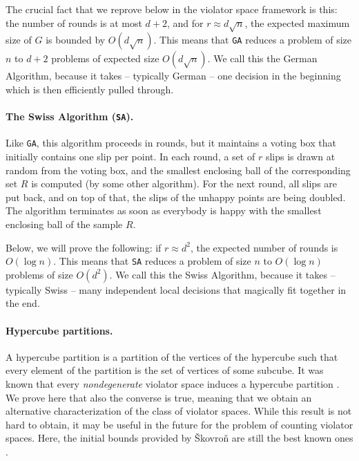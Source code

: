 \documentclass[12pt]{article}
\theoremstyle{remark}
\def\stageI{\texttt{GA}}
\def\stageII{\texttt{SA}}
\begin{document}
The crucial fact that we reprove below in the violator space framework
is this: the number of rounds is at most $d+2$, and for $r\approx
d\sqrt{n}$, the expected maximum size of $G$ is bounded by
$O(d\sqrt{n})$. This means that \stageI{ }reduces a
problem of size $n$ to $d+2$ problems of expected size $O(d\sqrt{n})$.
We call this the German Algorithm, because it takes -- typically
German -- one decision in the beginning which is then efficiently
pulled through.

\paragraph{The Swiss Algorithm (\stageII).} 
Like \stageI, this algorithm proceeds in rounds, but it
maintains a voting box that initially contains one slip per point. In
each round, a set of $r$ slips is drawn at random from the voting box,
and the smallest enclosing ball of the corresponding set $R$ is
computed (by some other algorithm). For the next round, all slips are
put back, and on top of that, the slips of the unhappy points are being
doubled. The algorithm terminates as soon as everybody is happy with
the smallest enclosing ball of the sample $R$.

Below, we will prove the following: if $r\approx d^2$, the expected number
of rounds is $O(\log n)$. This means that \stageII{ }reduces a
problem of size $n$ to $O(\log n)$ problems of size $O(d^2)$. We call
this the Swiss Algorithm, because it takes -- typically Swiss -- many 
independent local decisions that magically fit together in the end.

\paragraph{Hypercube partitions.}
A hypercube partition is a partition of the vertices of the hypercube
such that every element of the partition is the set of vertices of
some subcube. It was known that every \emph{nondegenerate} violator
space induces a hypercube partition
\cite{SkovronMatousekLPdim,MatousekLPdim}.  We prove here that also
the converse is true, meaning that we obtain an alternative
characterization of the class of violator spaces. While this result is
not hard to obtain, it may be useful in the future for the problem of
counting violator spaces. Here, the initial bounds provided by
\v{S}kovro\v{n} are still the best known ones \cite{skovronP}.
\end{document}
